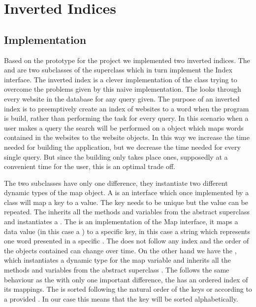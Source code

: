 \section{Inverted Indices}

\subsection{Implementation}\label{sec:invertedindicies-imp}
Based on the prototype for the project we implemented two inverted indices. The  and  are two subclasses of the superclass  which in turn implement the Index interface. The inverted index is a clever implementation of the  class trying to overcome the problems given by this naive implementation. The  looks through every website in the database for any query given. The purpose of an inverted index is to preemptively create an index of websites to a word when the program is build, rather than performing the task for every query. In this scenario when a user makes a query the search will be performed on a  object which maps words contained in the websites to the website objects. In this way we increase the time needed for building the application, but we decrease the time needed for every single query. But since the building only takes place ones, supposedly at a convenient time for the user, this is an optimal trade off.

The two subclasses have only one difference, they instantiate two different dynamic types of the map object. A  is an interface which once implemented by a class will map a key to a value. The key needs to be unique but the value can be repeated.
The  inherits all the methods and variables from the abstract superclass  and instantiates a . The  is an implementation of the Map interface, it maps a data value (in this case a ) to a specific key, in this case a string which represents one word presented in a specific . The  does not follow any index and the order of the objects contained can change over time.
On the other hand we have the , which instantiates a  dynamic type for the map variable and inherits all the methods and variables from the abstract superclass . The  follows the same behaviour as the  with only one important difference, the  has an ordered index of its mappings. The  is sorted following the natural order of the keys or according to a provided . In our case this means that the  key will be sorted alphabetically.

